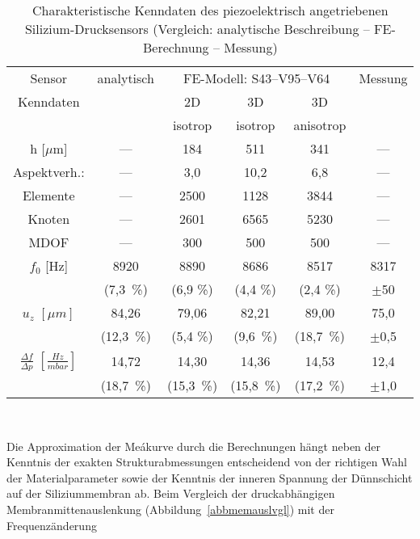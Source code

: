 \begin{table}[htb]
\caption
 {\label{tabvglm723}
 Charakteristische Kenndaten des piezoelektrisch angetriebenen
 Silizium-Drucksensors
 (Vergleich: analytische Beschreibung -- FE-Berechnung -- Messung)}
\begin{center}
\begin{tabular}{|c||c||c|c|c||c|}
\hline
Sensor & analytisch & \multicolumn{3}{c||}{FE-Modell: S43--V95--V64}
       & Messung \\
\cline{3-5}
 Kenndaten &     & 2D      & 3D      & 3D        & \\[-1.2ex]
           &     & isotrop & isotrop & anisotrop & \\
\hline \hline
h $[\mu$m] & --- & 184     & 511     & 341       & --- \\
Aspektverh.: & --- & 3,0 & 10,2 & 6,8 & --- \\
\hline
Elemente   & --- & 2500    & 1128    & 3844      & --- \\
Knoten     & --- & 2601    & 6565    & 5230      & --- \\
MDOF       & --- & 300     & 500     & 500       & --- \\
\hline \hline
$f_{0}$ [Hz]
           &  8920  &  8890   &  8686   &  8517   &  8317   \\
           & (7,3~\%) & (6,9 \%) & (4,4 \%) & (2,4 \%) &  $\pm$50 \\
\hline
$u_{z}$ $[\mu m]$
           & 84,26    &  79,06   & 82,21   & 89,00    & 75,0     \\
           & (12,3~\%) & (5,4 \%) & (9,6~\%) & (18,7~\%) & $\pm$0,5  \\
\hline
$\frac{\Delta f}{\Delta p}$ $[\frac{Hz}{mbar}]$
        & 14,72    & 14,30    & 14,36    & 14,53    & 12,4    \\
  	& (18,7~\%) & (15,3~\%) & (15,8~\%) & (17,2~\%) & $\pm$1,0 \\
\hline
\end{tabular}\\
\end{center}
\end{table}
Die Approximation der Meákurve durch die Berechnungen hängt neben
der Kenntnis der exakten Strukturabmessungen entscheidend von der richtigen
Wahl der Materialparameter sowie der Kenntnis der inneren Spannung der
Dünnschicht auf der Siliziummembran ab.
Beim Vergleich der druckabhängigen Membranmittenauslenkung
(Abbildung~\ref{abbmemauslvgl}) mit der Frequenzänderung
